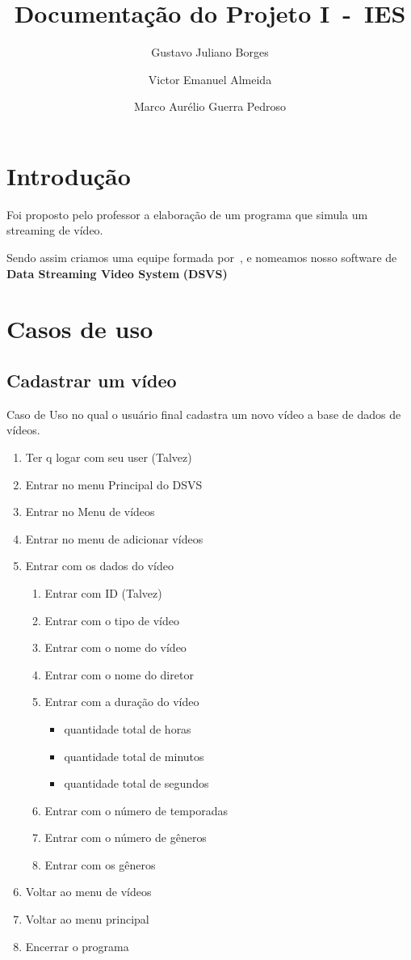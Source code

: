 \documentclass[12pt, a4paper]{article}
\author{Gustavo Juliano Borges \and Victor Emanuel Almeida \and Marco Aurélio Guerra Pedroso}
\title{Documentação do Projeto I~-~IES}
\begin{document}
\begin{titlepage}
\maketitle\thispagestyle{empty}
\end{titlepage}
\section{Introdução}

Foi proposto pelo professor a elaboração de um programa que simula um streaming de vídeo.

Sendo assim criamos uma equipe formada por~\textbf{\theauthor}, e nomeamos nosso software de \textbf{Data Streaming Video System} \textbf{(DSVS)}

\section{Casos de uso}

\subsection{Cadastrar um vídeo}
Caso de Uso no qual o usuário final cadastra um novo vídeo a base de dados de vídeos.
\begin{enumerate}
	\item Ter q logar com seu user (Talvez)
	\item Entrar no menu Principal do DSVS
	\item Entrar no Menu de vídeos
	\item Entrar no menu de adicionar vídeos
	\item Entrar com os dados do vídeo
		\begin{enumerate}
			\item Entrar com ID (Talvez)
			\item Entrar com o tipo de vídeo
			\item Entrar com o nome do vídeo
			\item Entrar com o nome do diretor
			\item Entrar com a duração do vídeo
				\begin{itemize}
					\item quantidade total de horas
					\item quantidade total de minutos
					\item quantidade total de segundos
				\end{itemize}
			\item Entrar com o número de temporadas
			\item Entrar com o número de gêneros
			\item Entrar com os gêneros
		\end{enumerate}
	\item Voltar ao menu de vídeos
	\item Voltar ao menu principal
	\item Encerrar o programa
\end{enumerate}
\end{document}
